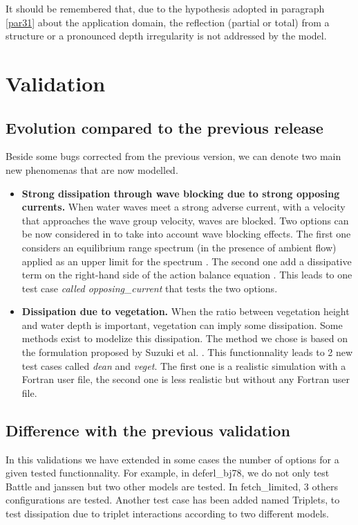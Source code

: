 It should be remembered that, due to the hypothesis adopted in paragraph \ref{par31} about the \tomawac application domain, the reflection (partial or total) from a structure or a pronounced depth irregularity is not addressed by the model.

\chapter{Validation}
%
\section{Evolution compared to the previous release}
Beside some bugs corrected from the previous version, we can denote two main new phenomenas that are now modelled. 
\begin{itemize}
\item {\bf Strong dissipation through wave blocking due to strong opposing currents.} When water waves meet a strong adverse current, with a velocity that approaches the wave group velocity, waves are blocked. Two options can be now considered in \tomawac to take into account wave blocking effects. The first one considers an equilibrium range spectrum (in the presence of ambient flow) applied as an upper limit for the spectrum  \cite{Hedges1985}. The second one add a dissipative term on the right-hand side of the action balance equation \cite{Westhuys2012}. This leads to one test case {\it called opposing\_current} that tests the two options.  
\item {\bf Dissipation due to vegetation.} When the ratio between vegetation height and water depth is important, vegetation can imply some dissipation. Some methods exist  to modelize this dissipation. The method we chose is based on the formulation proposed by Suzuki et al. \cite{Suzuki2011}. This functionnality leads to 2 new test cases called {\it dean } and {\it veget}. The first one is a realistic simulation with a Fortran user file, the second one is less realistic but without any Fortran user file. 
\end {itemize} 
\section{Difference with the previous validation}
In this validations we have extended in some cases the number of options for a given tested functionnality. For example, in deferl\_bj78, we do not only test Battle and janssen but two other models are tested. In fetch\_limited, 3 others configurations are tested. Another test case has been added named Triplets, to test dissipation due to triplet interactions according to two different models.

